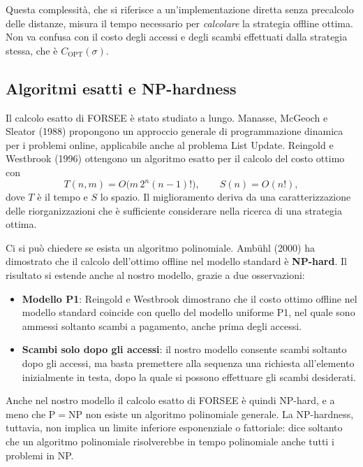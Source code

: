 \begin{osservazione}
Questa complessità, che si riferisce a un'implementazione diretta senza precalcolo delle distanze, misura il tempo necessario per \emph{calcolare} la strategia offline ottima. Non va confusa con il costo degli accessi e degli scambi effettuati dalla strategia stessa, che è $C_{\mathrm{OPT}}(\sigma)$.
\end{osservazione}

\subsection{Algoritmi esatti e NP-hardness}\label{sec:mtf-np}
Il calcolo esatto di FORSEE è stato studiato a lungo. Manasse, McGeoch e Sleator (1988) \cite{Manasse1988} propongono un approccio generale di programmazione dinamica per i problemi online, applicabile anche al problema List Update. Reingold e Westbrook (1996) \cite{Reingold1996} ottengono un algoritmo esatto per il calcolo del costo ottimo con
\[
T(n, m) = O\big(m\, 2^n (n-1)!\big), \qquad S(n) = O(n!),
\]
dove $T$ è il tempo e $S$ lo spazio. Il miglioramento deriva da una caratterizzazione delle riorganizzazioni che è sufficiente considerare nella ricerca di una strategia ottima.

Ci si può chiedere se esista un algoritmo polinomiale. Ambühl (2000) \cite{Ambuhl2000} ha dimostrato che il calcolo dell'ottimo offline nel modello standard è \textbf{NP-hard}. Il risultato si estende anche al nostro modello, grazie a due osservazioni:
\begin{itemize}
    \item \textbf{Modello P1}: Reingold e Westbrook dimostrano che il costo ottimo offline nel modello standard coincide con quello del modello uniforme P1, nel quale sono ammessi soltanto scambi a pagamento, anche prima degli accessi.
    \item \textbf{Scambi solo dopo gli accessi}: il nostro modello consente scambi soltanto dopo gli accessi, ma basta premettere alla sequenza una richiesta all'elemento inizialmente in testa, dopo la quale si possono effettuare gli scambi desiderati.
\end{itemize}
Anche nel nostro modello il calcolo esatto di FORSEE è quindi NP-hard, e a meno che $\mathrm{P} = \mathrm{NP}$ non esiste un algoritmo polinomiale generale. La NP-hardness, tuttavia, non implica un limite inferiore esponenziale o fattoriale: dice soltanto che un algoritmo polinomiale risolverebbe in tempo polinomiale anche tutti i problemi in NP.

